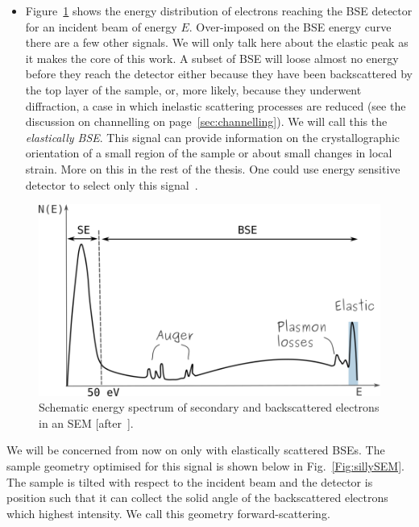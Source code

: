 \begin{itemize}
    \item Figure~\ref{Fig:Espectrum} shows the energy distribution of electrons reaching the BSE detector for an incident beam of energy $E$. Over-imposed on the BSE energy curve there are a few other signals. We will only talk here about the elastic peak as it makes the core of this work. A subset of BSE will loose almost no energy before they reach the detector either because they have been backscattered by the top layer of the sample, or, more likely, because they underwent diffraction, a case in which inelastic scattering processes are reduced (see the discussion on channelling on page~\ref{sec:channelling}). We will call this the \textit{elastically BSE}. This signal can provide information on the crystallographic orientation of a small region of the sample or about small changes in local strain. More on this in the rest of the thesis. One could use energy sensitive detector to select only this signal~\cite{Stefano}.
\end{itemize}

\begin{figure}[ht]
\centering
\includegraphics[width=0.62\linewidth]{Figures/spectrum.png}
\caption[SEM electrons energy spectrum.]{Schematic energy spectrum of secondary and backscattered electrons in an SEM [after~\cite{bell12}].}
\label{Fig:Espectrum}
\end{figure}


We will be concerned from now on only with elastically scattered BSEs. The sample geometry optimised for this signal is shown below in Fig.~\ref{Fig:sillySEM}. The sample is tilted with respect to the incident beam and the detector is position such that it can collect the solid angle of the backscattered electrons which highest intensity. We call this geometry forward-scattering. 



\vspace{0.2cm}

